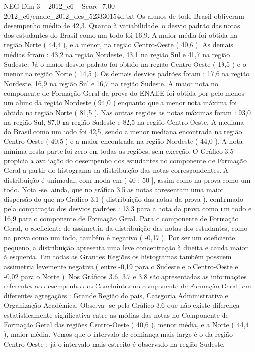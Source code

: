 \begin{textsample}{NEG Dim 3 – 2012\_c6 – Score -7.00 – 2012\_c6/enade\_2012\_des\_523330154d.txt}
Os alunos de todo Brasil obtiveram desempenho médio de 42,3.
Quanto à variabilidade, o desvio padrão das notas dos estudantes do Brasil como um todo foi 16,9.
A maior média foi obtida na região Norte ( 44,4 ), e a menor, na região Centro-Oeste ( 40,6 ).
As demais médias foram : 43,2 na região Nordeste, 43,1 na região Sul e 41,7 na região Sudeste.
Já o maior desvio padrão foi obtido na região Centro-Oeste ( 19,5 ) e o menor na região Norte ( 14,5 ).
Os demais desvios padrões foram : 17,6 na região Nordeste, 16,9 na região Sul e 16,7 na região Sudeste.
A maior nota no componente de Formação Geral da prova do ENADE foi obtida por pelo menos um aluno da região Nordeste ( 94,0 ) enquanto que a menor nota máxima foi obtida na região Norte ( 81,5 ).
Nas outras regiões as notas máximas foram : 93,0 na região Sul, 87,0 na região Sudeste e 82,5 na região Centro-Oeste.
A mediana do Brasil como um todo foi 42,5, sendo a menor mediana encontrada na região Centro-Oeste ( 40,5 ) e a maior encontrada na região Nordeste ( 44,0 ).
A nota mínima nesta parte foi zero em todas as regiões, sem exceção.
O Gráfico 3.5 propicia a avaliação do desempenho dos estudantes no componente de Formação Geral a partir do histograma da distribuição das notas correspondentes.
A distribuição é unimodal, com moda em ( 40 ; 50 ], assim como na prova como um todo.
Nota -se, ainda, que no gráfico 3.5 as notas apresentam uma maior dispersão do que no Gráfico 3.1 ( distribuição das notas da prova ), confirmado pela comparação dos desvios padrões : 13,3 para a nota da prova como um todo e 16,9 para o componente de Formação Geral.
Para o componente de Formação Geral, o coeficiente de assimetria da distribuição das notas dos estudantes, como na prova como um todo, também é negativo ( -0,17 ).
Por ser um coeficiente pequeno, a distribuição apresenta uma leve concentração à direita e cauda maior à esquerda.
Em todas as Grandes Regiões os histogramas também possuem assimetria levemente negativa ( entre -0,19 para o Sudeste e o Centro-Oeste e -0,02 para o Norte ).
Nos Gráficos 3.6, 3.7 e 3.8 são apresentadas as informações referentes ao desempenho dos Concluintes no componente de Formação Geral, em diferentes agregações : Grande Região do país, Categoria Administrativa e Organização Acadêmica.
Observa -se pelo Gráfico 3.6 que não existe diferença estatisticamente significativa entre as médias das notas no Componente de Formação Geral das regiões Centro-Oeste ( 40,6 ), menor média, e a Norte ( 44,4 ), maior média.
Vemos que o intervalo de confiança mais largo é o da região Centro-Oeste ; já o intervalo mais estreito é observado na região Sudeste.

\end{textsample}
